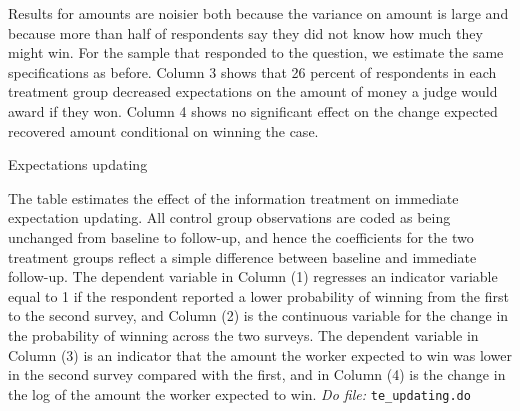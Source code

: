 \documentclass[oneside,12pt]{article}
\begin{document}
Results for amounts are noisier both because the variance on amount is large and because more than half of respondents say they did not know how much they might win. For the sample that responded to the question, we estimate the same specifications as before. Column 3 shows that 26 percent of respondents in each treatment group decreased expectations on the amount of money a judge would award if they won. Column 4 shows no significant effect on the change expected recovered amount conditional on winning the case.


\begin{table}[H]
    \caption{Expectations updating} 
    \label{tab:6_TE_updating}
    \begin{center}
    \scriptsize{}
    \end{center}
     \scriptsize {\noindent The table estimates the effect of the information treatment on immediate expectation updating. All control group observations are coded as being unchanged from baseline to follow-up, and hence the coefficients for the two treatment groups reflect a simple difference between baseline and immediate follow-up. The dependent variable in Column (1) regresses an indicator variable equal to 1 if the respondent reported a lower probability of winning from the first to the second survey, and Column (2) is the continuous variable for the change in the probability of winning across the two surveys. The dependent variable in Column (3) is an indicator that the amount the worker expected to win was lower in the second survey compared with the first, and in Column (4) is the change in the log of the amount the worker expected to win.
    \textit{Do file: } \texttt{te\_updating.do}
}
\end{table}
  
\end{document}
